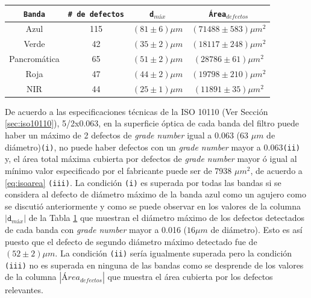 \begin{table}
\begin{center}
\begin{tabular}{ |c|c|c|c| }    \toprule
\texttt{Banda} & \texttt{\# de defectos} & \texttt{d$_{máx}$} & \texttt{Área$_{defectos}$}\\\midrule
\rowcolor{blue!15} Azul    & 115 & $(81 \pm 6)\mu m$ & $(71488 \pm 583)\mu m^{2}$   \\ 
\rowcolor{green!50} Verde  & 42 &  $(35 \pm 2)\mu m$ &  $(18117 \pm 248) \mu m^{2}$\\ 
Pancromática& 65 & $(51 \pm 2)\mu m$ & $(28786 \pm 61)\mu m^{2}$  \\
\rowcolor{red!50} Roja & 47 &  $(44 \pm 2)\mu m$ &   $(19798 \pm 210 )\mu m^{2}$ \\
\rowcolor{maroon!20} NIR & 44 & $(25 \pm 1) \mu m$  & $(11891 \pm 35 )\mu m^{2}$ \\
\bottomrule
 \hline
\end{tabular}
\end{center}
 \label{tabISO}
\end{table}

De acuerdo a las especificaciones técnicas de la ISO 10110 (Ver Sección \ref{sec:iso10110}), 5/2x0.063,  en la superficie óptica de cada banda del filtro puede haber un máximo de 2 defectos de \textit{grade number} igual a 0.063 (63 $\mu m$ de diámetro)\texttt{(i)}, no puede haber defectos con un \textit{grade number} mayor a 0.063\texttt{(ii)} y, el área total máxima cubierta por defectos de \textit{grade number} mayor ó igual al mínimo valor especificado por el fabricante puede ser de 7938 $\mu m^{2}$, de acuerdo a \ref{eq:isoarea} \texttt{(iii)}. La condición \texttt{(i)} es superada por todas las bandas si se considera al defecto de diámetro máximo de la banda azul como un agujero como se discutió anteriormente y como se puede observar en los valores de la columna $|\texttt{d$_{máx}$}|$ de la Tabla \ref{tabISO} que muestran el diámetro máximo de los defectos detectados de cada banda con \textit{grade number} mayor a 0.016 ($16 \mu m$ de diámetro). Esto es así puesto que el defecto de segundo diámetro máximo detectado fue de $(52 \pm 2) \mu m$. La condición \texttt{(ii)} sería igualmente superada pero la condición \texttt{(iii)} no es superada en ninguna de las bandas como se desprende de los valores de la columna $| Área_{defectos}|$  que muestra el área cubierta por los defectos relevantes.

